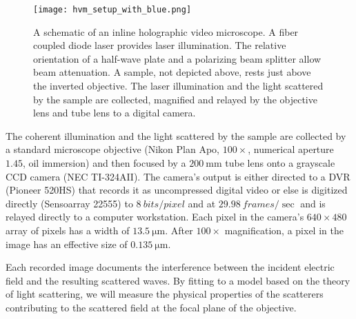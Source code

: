 \begin{figure}
  \centering
  \texttt{[image: hvm\_setup\_with\_blue.png]}
  \caption{A schematic of an inline holographic video microscope. A fiber
    coupled diode laser provides laser illumination. The relative orientation
    of a half-wave plate and a polarizing beam splitter allow beam attenuation.
    A sample, not depicted above, rests just above the inverted objective.
    The laser illumination and the light scattered by the sample
    are collected, magnified and relayed by the objective lens
    and tube lens to a digital camera.}
  \label{fig:hvm_setup}
\end{figure}


The coherent illumination and the light scattered by the sample are collected by a
standard microscope objective (Nikon Plan Apo, $\num{100}\times$,
numerical aperture $\num{1.45}$, oil immersion) and then focused
by a $\SI{200}{\mm}$ tube lens onto a grayscale CCD camera
(NEC TI-324AII).
The camera's output is either directed to a DVR (Pioneer 520HS) that records
it as uncompressed digital video or else is digitized directly (Sensoarray 22555)
to $\SI{8}{bits\per pixel}$ and at $\SI{29.98}{frames\per\sec}$ and is relayed
directly to a computer workstation.
Each pixel in the camera's $\si{640\times 480}$ array of pixels has a width of
$\SI{13.5}{\um}$. After $100\times$ magnification, a pixel in the
image has an effective size of $\SI{0.135}{\um}$.

Each recorded image documents the interference between the incident
electric field and the resulting scattered waves. By fitting
to a model based on the theory of light scattering, we will measure the physical
properties of the scatterers contributing to the scattered field
at the focal plane of the objective.





